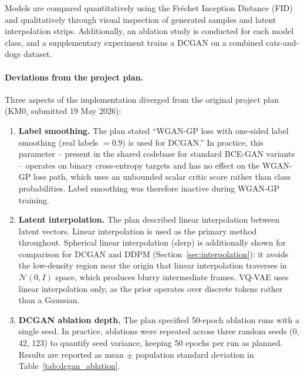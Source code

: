 \documentclass[12pt,a4paper]{article}
\begin{document}
Models are compared quantitatively using the Fr\'{e}chet Inception Distance (FID)
and qualitatively through visual inspection of generated samples and latent
interpolation strips.  Additionally, an ablation study is conducted for each
model class, and a supplementary experiment trains a DCGAN on a combined
cats-and-dogs dataset.

\paragraph{Deviations from the project plan.}
Three aspects of the implementation diverged from the original project plan
(KM0, submitted 19 May 2026):

\begin{enumerate}[noitemsep]
  \item \textbf{Label smoothing.}
        The plan stated ``WGAN-GP loss with one-sided label smoothing
        (real labels $= 0.9$) is used for DCGAN.''  In practice, this
        parameter -- present in the shared codebase for standard BCE-GAN
        variants -- operates on binary cross-entropy targets and has no
        effect on the WGAN-GP loss path, which uses an unbounded scalar
        critic score rather than class probabilities.  Label smoothing was
        therefore inactive during WGAN-GP training.

  \item \textbf{Latent interpolation.}
        The plan described linear interpolation between latent vectors.
        Linear interpolation is used as the primary method throughout.
        Spherical linear interpolation (slerp) is additionally shown for
        comparison for DCGAN and DDPM (Section~\ref{sec:interpolation}):
        it avoids the low-density region near the origin that linear
        interpolation traverses in $\mathcal{N}(0,I)$ space, which
        produces blurry intermediate frames.  VQ-VAE uses linear
        interpolation only, as the prior operates over discrete tokens
        rather than a Gaussian.

  \item \textbf{DCGAN ablation depth.}
        The plan specified 50-epoch ablation runs with a single seed.  In
        practice, ablations were repeated across three random seeds (0, 42,
        123) to quantify seed variance, keeping 50 epochs per run as planned.
        Results are reported as mean $\pm$ population standard deviation
        in Table~\ref{tab:dcgan_ablation}.
\end{enumerate}
\end{document}
